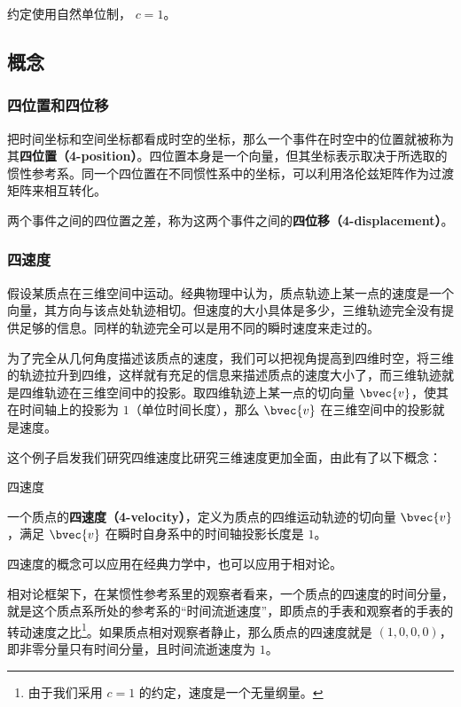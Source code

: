 

约定使用自然单位制， $c=1$。

\subsection{概念}
\subsubsection{四位置和四位移}
把时间坐标和空间坐标都看成时空的坐标，那么一个事件在时空中的位置就被称为其\textbf{四位置（4-position）}。四位置本身是一个向量，但其坐标表示取决于所选取的惯性参考系。同一个四位置在不同惯性系中的坐标，可以利用洛伦兹矩阵作为过渡矩阵来相互转化。

两个事件之间的四位置之差，称为这两个事件之间的\textbf{四位移（4-displacement）}。

\subsubsection{四速度}

假设某质点在三维空间中运动。经典物理中认为，质点轨迹上某一点的速度是一个向量，其方向与该点处轨迹相切。但速度的大小具体是多少，三维轨迹完全没有提供足够的信息。同样的轨迹完全可以是用不同的瞬时速度来走过的。

为了完全从几何角度描述该质点的速度，我们可以把视角提高到四维时空，将三维的轨迹拉升到四维，这样就有充足的信息来描述质点的速度大小了，而三维轨迹就是四维轨迹在三维空间中的投影。取四维轨迹上某一点的切向量 $\bvec{v}$，使其在时间轴上的投影为 $1$（单位时间长度），那么 $\bvec{v}$ 在三维空间中的投影就是速度。

这个例子启发我们研究四维速度比研究三维速度更加全面，由此有了以下概念：

\begin{definition}{四速度}

一个质点的\textbf{四速度（4-velocity）}，定义为质点的四维运动轨迹的切向量 $\bvec{v}$，满足 $\bvec{v}$ 在瞬时自身系中的时间轴投影长度是 $1$。 

\end{definition}

四速度的概念可以应用在经典力学中，也可以应用于相对论。

相对论框架下，在某惯性参考系里的观察者看来，一个质点的四速度的时间分量，就是这个质点系所处的参考系的“时间流逝速度”，即质点的手表和观察者的手表的转动速度之比\footnote{由于我们采用 $c=1$ 的约定，速度是一个无量纲量。}。如果质点相对观察者静止，那么质点的四速度就是 $(1,0,0,0)$，即非零分量只有时间分量，且时间流逝速度为 $1$。

